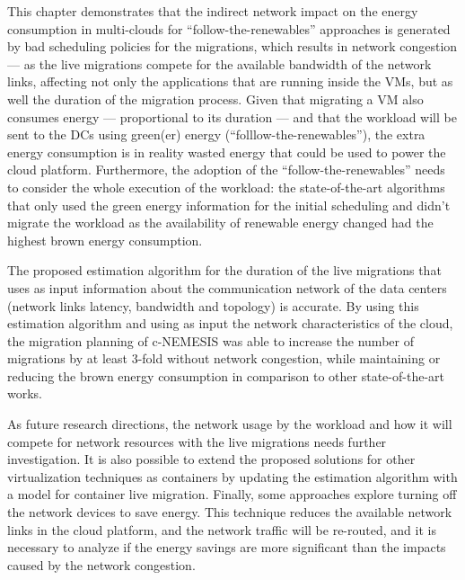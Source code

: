 This chapter demonstrates that the indirect network impact on the energy consumption in multi-clouds for ``follow-the-renewables'' approaches is generated by bad scheduling policies for the migrations, which results in network congestion --- as the live migrations compete for the available bandwidth of the network links, affecting not only the applications that are running inside the VMs, but as well the duration of the migration process. Given that migrating a VM also consumes energy --- proportional to its duration --- and that the workload will be sent to the DCs using green(er) energy (``folllow-the-renewables''), the extra energy consumption is in reality wasted energy that could be used to power the cloud platform. Furthermore, the adoption of the ``follow-the-renewables'' needs to consider the whole execution of the workload:  the state-of-the-art algorithms that only used the green energy information for the initial scheduling and didn't migrate the workload as the availability of renewable energy changed had the highest brown energy consumption. 

The proposed estimation algorithm for the duration of the live migrations that uses as input information about the communication network of the data centers (network links latency, bandwidth and topology) is accurate. By using this estimation algorithm and using as input the network characteristics of the cloud, the migration planning of c-NEMESIS was able to increase the number of migrations by at least 3-fold without network congestion, while maintaining or reducing the brown energy consumption in comparison to other state-of-the-art works.

As future research directions, the network usage by the workload and how it will compete for network resources with the live migrations needs further investigation. It is also possible to extend the proposed solutions for other virtualization techniques as containers by updating the estimation algorithm with a model for container live migration. Finally, some approaches explore turning off the network devices to save energy. This technique reduces the available network links in the cloud platform, and the network traffic will be re-routed, and it is necessary to analyze if the energy savings are more significant than the impacts caused by the network congestion.
